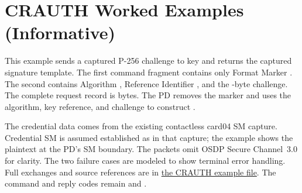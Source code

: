 \clearpage
\section{CRAUTH Worked Examples (Informative)}\label{app:crauth-examples}

This example sends a captured P-256 challenge to key  and returns
the captured signature template. The first command fragment contains only
Format Marker . The second contains Algorithm ,
Reference Identifier , and the -byte challenge.
The complete request record is  bytes. The PD removes the
marker and uses the algorithm, key reference, and challenge to construct
.

The credential data comes from the existing contactless card04 SM capture.
Credential SM is assumed established as in that capture; the example shows
the plaintext at the PD's SM boundary. The packets omit OSDP Secure Channel~3.0
for clarity. The two failure cases are modeled to show terminal error handling.
Full exchanges and source references are in
\href{run:worked-examples/crauth/examples.json}{the CRAUTH example file}.
The command and reply codes remain  and .


